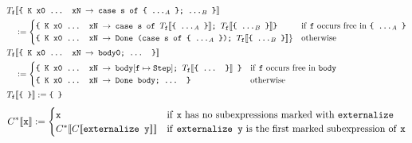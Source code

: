\documentclass[sigplan,screen]{acmart}
\newcommand{\expr}[1]{\llbracket#1\rrbracket} %
\newcommand{\rarr}{\rightarrow}
\newcommand{\ttt}{\texttt}
\begin{document}
\begin{align*}
  T_{\ttt{f}}&\expr{\ttt{\{ K x0 ... xN $\rarr$ case s of \{ ...$_A$ \}; ...$_B$ \}}}\\
    &:= %
      \begin{cases}
        \ttt{\{ K x0 ... xN $\rarr$ case s of $T_{\ttt{f}}\expr{\ttt{\{ ...$_A$ \}}}$; $T_{\ttt{f}}\expr{\ttt{\{ ...$_B$ \}}}$\}} & \text{if \ttt{f} occurs free in \ttt{\{ ...$_A$ \}}}\\
        \ttt{\{ K x0 ... xN $\rarr$ Done (case s of \{ ...$_A$ \}); $T_{\ttt{f}}\expr{\ttt{\{ ...$_B$ \}}}\}$} & \text{otherwise}
      \end{cases}\\
  T_{\ttt{f}}&\expr{\ttt{\{ K x0 ... xN $\rarr$ body0; ... \}}}\\
    &:=
      \begin{cases}
        \ttt{\{ K x0 ... xN $\rarr$ body}[\ttt{f} \mapsto \ttt{Step}]\ttt{; }T_{\ttt{f}}\expr{\ttt{\{ ... \}}}\ttt{ \}} & \text{if \ttt{f} occurs free in \ttt{body}}\\
        \ttt{\{ K x0 ... xN $\rarr$ Done body; ... \}} & \text{otherwise}
      \end{cases}\\
  T_{\ttt{f}}&\expr{\ttt{\{ \}}} := \ttt{\{ \}}\\
\end{align*}
\begin{align*}
  &C^{*}\expr{\ttt{x}} :=
    \begin{cases}
      \ttt{x} & \text{if \ttt{x} has no subexpressions marked with \ttt{externalize}}\\
      C^{*}\expr{C\expr{\ttt{externalize y}}} & \text{if \ttt{externalize y} is the first marked subexpression of \ttt{x}}\\
    \end{cases}\\
\end{align*}
\end{document}
